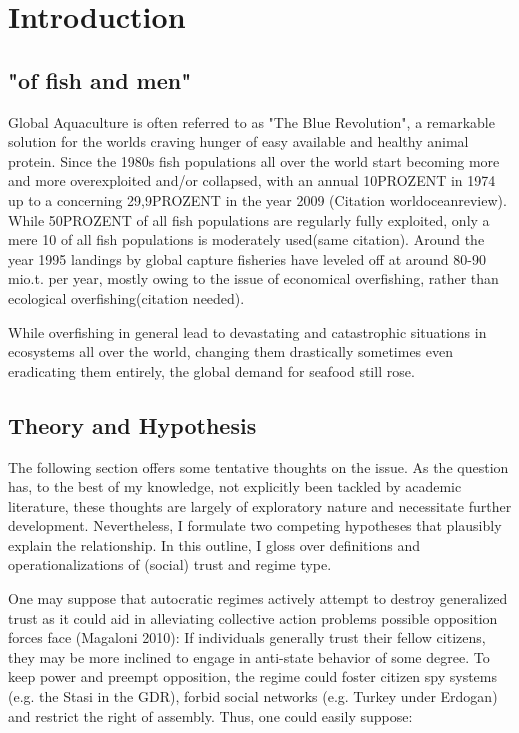 

\chapter{Introduction}
\section{"of fish and men"}
Global Aquaculture is often referred to as "The Blue Revolution", a remarkable solution for the worlds craving hunger of easy available and healthy animal protein. Since the 1980s fish populations all over the world start becoming more and more overexploited and/or collapsed, with an annual 10PROZENT in 1974 up to a concerning 29,9PROZENT in the year 2009 (Citation worldoceanreview). While 50PROZENT of all fish populations are regularly fully exploited, only a mere 10 of all fish populations is moderately used(same citation). Around the year 1995 landings by global capture fisheries
have leveled off at around 80-90 mio.t. per year, mostly owing to the issue of economical overfishing, rather than ecological overfishing(citation needed). 

While overfishing in general lead to devastating and catastrophic situations in ecosystems all over the world, changing them drastically sometimes even eradicating them entirely, the global demand for seafood still rose.


\section{Theory and Hypothesis}
The following section offers some tentative thoughts on the issue. As the question has, to the best of my knowledge, not explicitly been tackled by academic literature, these thoughts are largely of exploratory nature and necessitate further development. Nevertheless, I formulate two competing hypotheses that plausibly explain the relationship. In this outline, I gloss over definitions and operationalizations of (social) trust and regime type.

One may suppose that autocratic regimes actively attempt to destroy generalized trust as it could aid in alleviating collective action problems possible opposition forces face (Magaloni 2010)\nocite{magaloni2010game}: If individuals generally trust their fellow citizens, they may be more inclined to engage in anti-state behavior of some degree. To keep power and preempt opposition, the regime could foster citizen spy systems (e.g. the Stasi in the GDR), forbid social networks (e.g. Turkey under Erdogan) and restrict the right of assembly. Thus, one could easily suppose:

